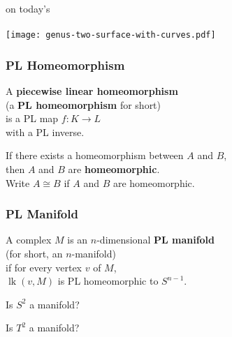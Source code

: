 \documentclass[14pt]{beamer}
\DeclareMathOperator{\lk}{lk}
\newcommand{\setbackgroundpicture}[1]{%
\usebackgroundtemplate{
\begin{pgfpicture}{0in}{0in}{\paperwidth}{\paperheight}
\pgfputat{\pgfxy(0,0)}{\texttt{[image: \#1]}}
\color{white}
\pgfsetfillopacity{0.8}
\pgfrect[fill]{\pgfxy(0,0)}{\pgfpoint{\paperwidth}{\paperheight}}
\end{pgfpicture}
}
}
\newcommand{\clearbackgroundpicture}{\usebackgroundtemplate{}}
\begin{document}
\setbackgroundpicture{problem03.pdf}
\begin{frame}
\vfill
\begin{center}
on today's \\
\scalebox{4}{homework} \\
\texttt{[image: genus-two-surface-with-curves.pdf]}
\end{center}
\vfill
\end{frame}
\clearbackgroundpicture

\begin{frame}
\frametitle{PL Homeomorphism}
\begin{definition}
  A \textbf{piecewise linear homeomorphism} \\
  \quad (a \textbf{PL homeomorphism} for short)\\
  is a PL map $f : K \to L$ \\
  with a PL inverse.
\end{definition}

\pause
If there exists a homeomorphism between $A$ and $B$, \\
then $A$ and $B$ are \textbf{homeomorphic}.  \\
Write $A \cong B$ if $A$ and $B$ are homeomorphic.


\end{frame}

\begin{frame}
  \frametitle{PL Manifold}
  
    A complex $M$ is an $n$-dimensional \textbf{PL manifold}\\
    \quad(for short, an $n$-manifold)\\
    if for every vertex $v$ of $M$, \\
    $\lk(v,M)$ is PL homeomorphic to $S^{n-1}$.

    \pause
   \vfill

   \begin{problem}
     Is $S^2$ a manifold?
   \end{problem}

   \pause
   \vfill

   \begin{problem}
     Is $T^2$ a manifold?
   \end{problem}

\end{frame}
\end{document}
